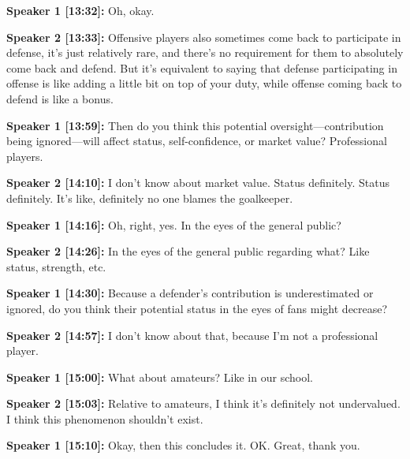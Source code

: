 \documentclass[11pt,a4paper]{article}
\begin{document}
\begin{linenumbers}
\vspace{0.5em}
\noindent \textbf{Speaker 1 [13:32]:} Oh, okay.

\vspace{0.5em}
\noindent \textbf{Speaker 2 [13:33]:} Offensive players also sometimes come back to participate in defense, it's just relatively rare, and there's no requirement for them to absolutely come back and defend. But it's equivalent to saying that defense participating in offense is like adding a little bit on top of your duty, while offense coming back to defend is like a bonus.

\vspace{0.5em}
\noindent \textbf{Speaker 1 [13:59]:} Then do you think this potential oversight---contribution being ignored---will affect status, self-confidence, or market value? Professional players.

\vspace{0.5em}
\noindent \textbf{Speaker 2 [14:10]:} I don't know about market value. Status definitely. Status definitely. It's like, definitely no one blames the goalkeeper.

\vspace{0.5em}
\noindent \textbf{Speaker 1 [14:16]:} Oh, right, yes. In the eyes of the general public?

\vspace{0.5em}
\noindent \textbf{Speaker 2 [14:26]:} In the eyes of the general public regarding what? Like status, strength, etc.

\vspace{0.5em}
\noindent \textbf{Speaker 1 [14:30]:} Because a defender's contribution is underestimated or ignored, do you think their potential status in the eyes of fans might decrease?

\vspace{0.5em}
\noindent \textbf{Speaker 2 [14:57]:} I don't know about that, because I'm not a professional player.

\vspace{0.5em}
\noindent \textbf{Speaker 1 [15:00]:} What about amateurs? Like in our school.

\vspace{0.5em}
\noindent \textbf{Speaker 2 [15:03]:} Relative to amateurs, I think it's definitely not undervalued. I think this phenomenon shouldn't exist.

\vspace{0.5em}
\noindent \textbf{Speaker 1 [15:10]:} Okay, then this concludes it. OK. Great, thank you.

\end{linenumbers}
\end{document}
